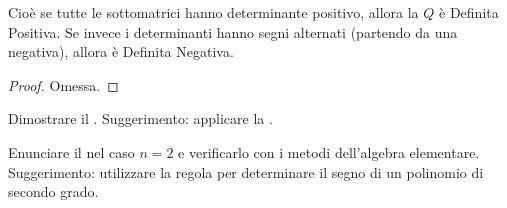 \begin{appendices}
\begin{corollary}
	Cioè se tutte le sottomatrici hanno determinante positivo, allora la $Q$ è Definita Positiva. Se invece i determinanti hanno segni alternati (partendo da una negativa), allora è Definita Negativa.
	\begin{proof}
		Omessa.
	\end{proof}
\end{corollary}
\begin{exercise}
	Dimostrare il . Suggerimento: applicare la .
\end{exercise}
\begin{exercise}
	Enunciare il  nel caso $n = 2$ e verificarlo con i metodi dell'algebra elementare.\\
	Suggerimento: utilizzare la regola per determinare il segno di un polinomio di secondo grado.
\end{exercise}
\end{appendices}
